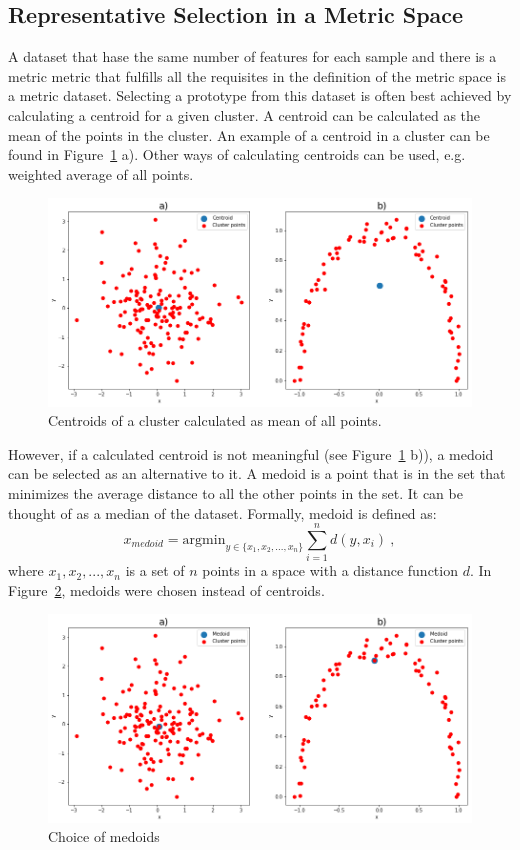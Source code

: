 \documentclass[thesis=B,english]{FITthesis}[2012/10/20]
\begin{document}
\subsection{Representative Selection in a Metric Space}\label{sec:rep_select_metric}
A dataset that hase the same number of features for each sample and there is a metric metric that fulfills all the requisites in the definition of the metric space is a metric dataset.
Selecting a prototype from this dataset is often best achieved by calculating a centroid for a given cluster.
A centroid can be calculated as the mean of the points in the cluster.
An example of a centroid in a cluster can be found in Figure~\ref{img:centroids} a).
Other ways of calculating centroids can be used, e.g. weighted average of all points.

\begin{figure}
  \includegraphics[width=\linewidth]{img/centroids.png}
  \caption{Centroids of a cluster calculated as mean of all points.}
  \label{img:centroids}
\end{figure}

However, if a calculated centroid is not meaningful (see Figure~\ref{img:centroids} b)), a medoid can be selected as an alternative to it.
A medoid is a point that is in the set that minimizes the average distance to all the other points in the set.
It can be thought of as a median of the dataset.
Formally, medoid is defined as:
\begin{equation}
x_{medoid} = \mathrm{argmin}_{y \in \{x_1, x_2, ..., x_n\}} \sum_{i=1}^{n}{d(y, x_i)}\:, \tag{5}
\end{equation}
where $x_1, x_2, ..., x_n$ is a set of $n$ points in a space with a distance function $d$.
In Figure~\ref{img:medoids}, medoids were chosen instead of centroids.
\begin{figure}
  \includegraphics[width=\linewidth]{img/medoids.png}
  \caption{Choice of medoids}
  \label{img:medoids}
\end{figure}
\end{document}
